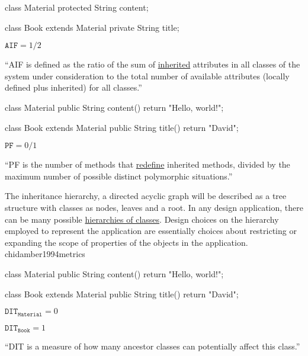 \documentclass{article}
\begin{document}
{
\begin{multicols}{2}
{\small\begin{ffcode}
class Material {
  protected String content;
}

class Book extends Material {
  private String title;
}
\end{ffcode}
}
\par\columnbreak\par
\(\texttt{AIF} = 1/2\)\par
``AIF is defined as the ratio of the sum of \ul{inherited} attributes in all classes of
the system under consideration to the total number of available attributes
(locally defined plus inherited) for all classes.''
\end{multicols}
\plush{}

\begin{multicols}{2}
{\small\begin{ffcode}
class Material {
  public String content() {
    return "Hello, world!";
  }
}

class Book extends Material {
  public String title() {
    return "David";
  }
}
\end{ffcode}
}
\par\columnbreak\par
\(\texttt{PF} = 0/1\)\par
``PF is the number of methods that \ul{redefine} inherited methods, divided by the
maximum number of possible distinct polymorphic situations.''
\end{multicols}
\plush{}

  {The inheritance hierarchy, a directed acyclic graph will be described as a tree structure with classes as nodes, leaves and a root. In any design application, there can be many possible \ul{hierarchies of classes}. Design choices on the hierarchy employed to represent the application are essentially choices about restricting or expanding the scope of properties of the objects in the application.}
  {chidamber1994metrics}

\begin{multicols}{2}
{\small\begin{ffcode}
class Material {
  public String content() {
    return "Hello, world!";
  }
}

class Book extends Material {
  public String title() {
    return "David";
  }
}
\end{ffcode}
}
\par\columnbreak\par
\(\texttt{DIT}_\texttt{Material} = 0\)\par
\(\texttt{DIT}_\texttt{Book} = 1\)\par
``DIT is a measure of how many ancestor classes can potentially affect this class.''
\end{multicols}
\plush{}

}
\end{document}
